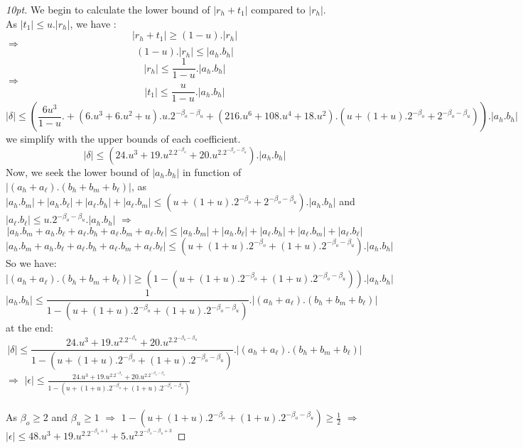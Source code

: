 \begin{proof}[10pt]
We begin to calculate the lower bound of $\lvert r_h + t_1 \rvert $ compared to $\lvert r_h \rvert$.\\
As $\lvert t_1 \rvert \le u. \lvert r_h \rvert$, we have :
$$\lvert r_h + t_1 \rvert \ge (1 - u). \lvert r_h \rvert$$
$\Rightarrow$
$$(1 - u). \lvert r_h \rvert \le \lvert a_h.b_h \rvert$$
$$ \lvert r_h \rvert \le \frac{1}{1-u}.\lvert a_h.b_h \rvert$$
$\Rightarrow$
$$ \lvert t_1 \rvert \le \frac{u}{1-u}.\lvert a_h.b_h \rvert$$
$$\lvert \delta \rvert \le (\frac{6u^3}{1-u}. +  (6.u^3 +6.u^2 +u).u.2^{-\beta_o -\beta_u}  + (216.u^6+108.u^4 + 18.u^2).(u + (1+ u).2^{-\beta_o} + 2^{-\beta_o -\beta_u})).\lvert a_h.b_h \rvert $$
we simplify with the upper bounds of each coefficient.
$$\lvert \delta \rvert \le (24.u^3  + 19.u^2.2^{-\beta_o} + 20.u^2.2^{-\beta_o -\beta_u}).\lvert a_h.b_h \rvert $$
Now, we seek the lower bound of $\lvert a_h.b_h \rvert $ in function of $\lvert (a_h +a_{\ell}).(b_h + b_m +b_{\ell}) \rvert$, as $\lvert a_h.b_m \rvert + \lvert a_h.b_{\ell} \rvert + \lvert a_{\ell}.b_h \rvert + \lvert a_{\ell}.b_m \rvert \le (u + (1+ u).2^{-\beta_o} + 2^{-\beta_o -\beta_u}).\lvert a_h.b_h \rvert $ and $\lvert a_{\ell}.b_{\ell} \rvert \le u.2^{-\beta_o -\beta_u}.\lvert a_h.b_h \rvert$ $\Rightarrow$
$$\lvert a_h.b_m+a_h.b_{\ell}+a_{\ell}.b_h+a_{\ell}.b_m + a_{\ell}.b_{\ell}\rvert \le \lvert a_h.b_m \rvert + \lvert a_h.b_{\ell} \rvert + \lvert a_{\ell}.b_h \rvert + \lvert a_{\ell}.b_m \rvert + \lvert a_{\ell}.b_{\ell} \rvert $$
$$\lvert a_h.b_m+a_h.b_{\ell}+a_{\ell}.b_h+a_{\ell}.b_m + a_{\ell}.b_{\ell}\rvert \le 
(u + (1+ u).2^{-\beta_o} + (1+u).2^{-\beta_o -\beta_u}).\lvert a_h.b_h \rvert$$
So we have:
$$\lvert (a_h +a_{\ell}).(b_h + b_m +b_{\ell}) \rvert \ge (1 - (u + (1+ u).2^{-\beta_o} + (1+u).2^{-\beta_o -\beta_u})).\lvert a_h.b_h \rvert$$
$$\lvert a_h.b_h \rvert \le \frac{1}{1 - (u + (1+ u).2^{-\beta_o} + (1+u).2^{-\beta_o -\beta_u})}.\lvert (a_h +a_{\ell}).(b_h + b_m +b_{\ell}) \rvert$$
at the end:
$$\lvert \delta \rvert \le \frac{24.u^3  + 19.u^2.2^{-\beta_o} + 20.u^2.2^{-\beta_o -\beta_u}}{1 - (u + (1+ u).2^{-\beta_o} + (1+u).2^{-\beta_o -\beta_u})}.\lvert (a_h +a_{\ell}).(b_h + b_m +b_{\ell}) \rvert $$
$\Rightarrow$
$\lvert \epsilon \rvert \le \frac{24.u^3  + 19.u^2.2^{-\beta_o} + 20.u^2.2^{-\beta_o -\beta_u}}{1 - (u + (1+ u).2^{-\beta_o} + (1+u).2^{-\beta_o -\beta_u})} $\\
\ \\
As $\beta_o \ge 2$ and $\beta_u \ge 1$ $\Rightarrow$ $1 - (u + (1+ u).2^{-\beta_o} + (1+u).2^{-\beta_o -\beta_u}) \ge \frac{1}{2}$ $\Rightarrow$\\
$\lvert \epsilon \rvert \le 48.u^3  + 19.u^2.2^{-\beta_o+1} + 5.u^2.2^{-\beta_o -\beta_u+3} $
\end{proof}